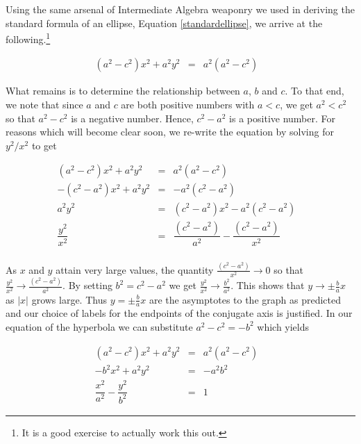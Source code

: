 \medskip

Using the same arsenal of Intermediate Algebra weaponry we used in deriving the standard formula of an ellipse, Equation \ref{standardellipse}, we arrive at the following.\footnote{It is a good exercise to actually work this out.} 

\[ \begin{array}{rclr} \left(a^2 - c^2\right) x^2 +a^2 y^2 & = & a^2 \left(a^2 - c^2\right)  & \end{array}\]

What remains is to determine the relationship between $a$, $b$ and $c$.  To that end, we note that since $a$ and $c$ are both positive numbers with $a < c$, we get $a^2 < c^2$ so that $a^2 - c^2$ is a negative number.  Hence, $c^2 - a^2$ is a positive number.  For reasons which will become clear soon, we re-write the equation by solving for $y^2/x^2$ to get
 
\[ \begin{array}{rclr} \left(a^2 - c^2\right) x^2 +a^2 y^2 & = & a^2 \left(a^2 - c^2\right)  & \\
-\left(c^2 - a^2\right) x^2 +a^2 y^2 & = & -a^2 \left(c^2 - a^2\right)  & \\
a^2 y^2 & = &  \left(c^2 - a^2\right) x^2 -  a^2\left(c^2 - a^2\right)& \\
\dfrac{y^2}{x^2} & = &  \dfrac{\left(c^2 - a^2\right)}{a^2} -  \dfrac{\left(c^2 - a^2\right)}{x^2}& \\ \end{array}\]

As $x$ and $y$ attain very large values, the quantity $\frac{\left(c^2 - a^2\right)}{x^2} \rightarrow 0$ so that $\frac{y^2}{x^2}  \rightarrow  \frac{\left(c^2 - a^2\right)}{a^2}$.  By setting $b^{2} = c^{2} - a^{2}$ we get 
$\frac{y^2}{x^2}  \rightarrow  \frac{b^2}{a^2}$.  This shows that $y \rightarrow \pm \frac{b}{a} x$ as $|x|$ grows large.  Thus $y = \pm \frac{b}{a} x$ are the asymptotes to the graph as predicted and our choice of labels for the endpoints of the conjugate axis is justified.  In our equation of the hyperbola we can substitute $a^2 - c^2 = -b^2$ which yields 

\[ \begin{array}{rclr} \left(a^2 - c^2\right) x^2 +a^2 y^2 & = & a^2 \left(a^2 - c^2\right)  &\\
-b^2 x^2 +a^2 y^2 & = & - a^2 b^2  & \\
\dfrac{x^2}{a^2} - \dfrac{y^2}{b^2} & = & 1 & \end{array} \]

